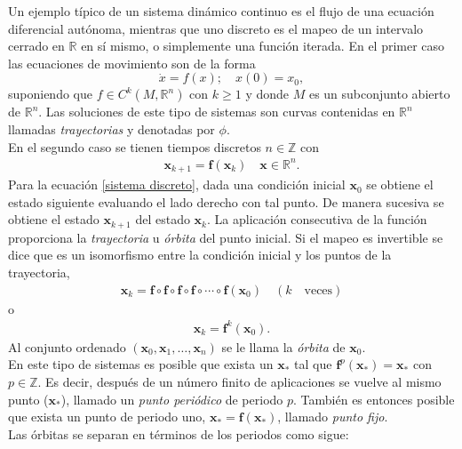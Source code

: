 Un ejemplo típico de un sistema dinámico continuo es el flujo de una ecuación diferencial autónoma, mientras que uno discreto es el mapeo de un intervalo cerrado en $\mathbb{R}$ en sí mismo, o simplemente una función iterada. En el primer caso las ecuaciones de movimiento son de la forma
\begin{equation}
\dot{x} =  f(x); \quad  
x(0)=x_{0} , \label{ec dif}
\end{equation}
suponiendo que $f \in C^{k}(M,\mathbb{R}^{n})$ con $k \geq 1$ y donde $M$ es un subconjunto abierto de $\mathbb{R}^{n}$. Las soluciones de este tipo de sistemas son curvas contenidas en $\mathbb{R}^{n}$ llamadas \textit{trayectorias} y denotadas por $\phi$.\\
En el segundo caso se tienen tiempos discretos $n\in \mathbb{Z}$ con 
\begin{eqnarray}
\pmb x_{k+1}= \mathbf{f}(\pmb x_{k}) \quad \pmb x\in \mathbb{R}^{n}. \label{sistema discreto}
\end{eqnarray}
Para la ecuación \eqref{sistema discreto}, dada una condición inicial $\pmb x_{0}$ se obtiene el estado siguiente evaluando el lado derecho con tal punto. De manera sucesiva se obtiene el estado $\pmb x_{k+1}$ del estado $\pmb x_{k}$. La aplicación consecutiva de la función proporciona la \textit{trayectoria} u \textit{órbita} del punto inicial. Si el mapeo es invertible se dice que es un isomorfismo entre la condición inicial y los puntos de la trayectoria,
\begin{eqnarray*}
\pmb x_{k}=\mathbf{f}\circ\mathbf{f}\circ \mathbf{f} \circ \mathbf{f} \circ  \cdots \circ \mathbf{f} (\pmb x_{0})\quad (k \quad \textrm{veces})
\end{eqnarray*}
o
\begin{eqnarray*}
\pmb x_{k} = \mathbf{f}^{k}(\pmb x_{0}).
\end{eqnarray*}
Al conjunto ordenado $( \pmb x_{0},\pmb x_{1},\ldots,\pmb x_{n} )$ se le llama la \textit{órbita} de $\pmb x_{0}$.\\

En este tipo de sistemas es posible que exista un $\pmb x_{*}$ tal que $\mathbf{f}^{p}(\pmb x_{*})=\pmb x_{*}$ con $p \in \mathbb{Z}$. Es decir, después de un número finito de aplicaciones se vuelve al mismo punto ($\pmb x_{*}$), llamado un \textit{punto periódico} de periodo $p$. También es entonces posible  que exista un punto de periodo uno, $\pmb x_{*}=\mathbf{f}(\pmb x_{*})$, llamado \textit{punto fijo}. \\
Las órbitas se separan en términos de los periodos como sigue:

